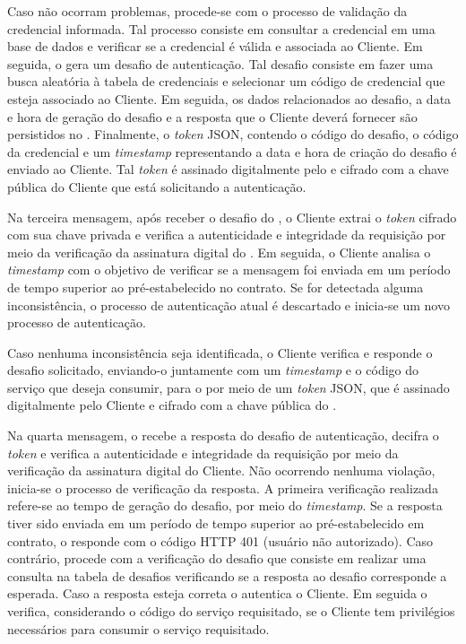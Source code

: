 Caso não ocorram problemas, procede-se com o processo de validação da credencial informada. Tal processo consiste em
consultar a credencial em uma base de dados e verificar se a credencial é válida e associada ao Cliente. Em seguida, o \servidorAA{} gera um desafio de autenticação. Tal desafio consiste em fazer uma busca aleatória à tabela de credenciais e selecionar um código de credencial que esteja associado ao Cliente. Em seguida, os dados relacionados ao desafio, a data e hora de geração do desafio e a resposta que o Cliente deverá fornecer são persistidos no \servidorBD. Finalmente, o \emph{token} JSON, contendo o código do desafio, o código da credencial e um \emph{timestamp} representando a data e hora de criação do desafio é enviado ao Cliente. Tal \emph{token} é assinado digitalmente pelo \servidorAA{} e cifrado com a chave pública do Cliente que está solicitando a autenticação.

Na terceira mensagem, após receber o desafio do \servidorAA, o Cliente extrai o \emph{token} cifrado com sua chave
privada e verifica a autenticidade e integridade da requisição por meio da verificação da assinatura digital do \servidorAA.
Em seguida, o Cliente analisa o \emph{timestamp} com o objetivo de verificar se a mensagem foi enviada em um período de tempo superior ao pré-estabelecido no contrato. Se for detectada alguma inconsistência, o processo de autenticação atual é descartado e inicia-se um novo processo de autenticação.

Caso nenhuma inconsistência seja identificada, o Cliente verifica e responde o desafio solicitado, enviando-o
juntamente com um \emph{timestamp} e o código do serviço que deseja consumir, para o \servidorAA{} por meio de um \emph{token} JSON, que é assinado digitalmente pelo Cliente e cifrado com a chave pública do \servidorAA.

Na quarta mensagem, o \servidorAA{} recebe a resposta do desafio de autenticação, decifra o \emph{token} e verifica a autenticidade e integridade da requisição por meio da verificação da assinatura digital do Cliente. Não ocorrendo nenhuma violação, inicia-se o processo de verificação da resposta. A primeira verificação realizada refere-se ao tempo de geração do desafio, por meio do \emph{timestamp}. Se a resposta tiver sido enviada em um período de tempo superior ao pré-estabelecido em contrato, o \servidorAA{} responde com o código HTTP 401 (usuário não autorizado). Caso contrário, procede com a verificação do desafio que consiste em realizar uma consulta na tabela de desafios verificando se a resposta ao desafio corresponde a esperada. Caso a resposta esteja correta o \servidorAA{}
autentica o Cliente. Em seguida o \servidorAA{} verifica, considerando o código do serviço requisitado, se o Cliente tem privilégios necessários para consumir o serviço requisitado.

